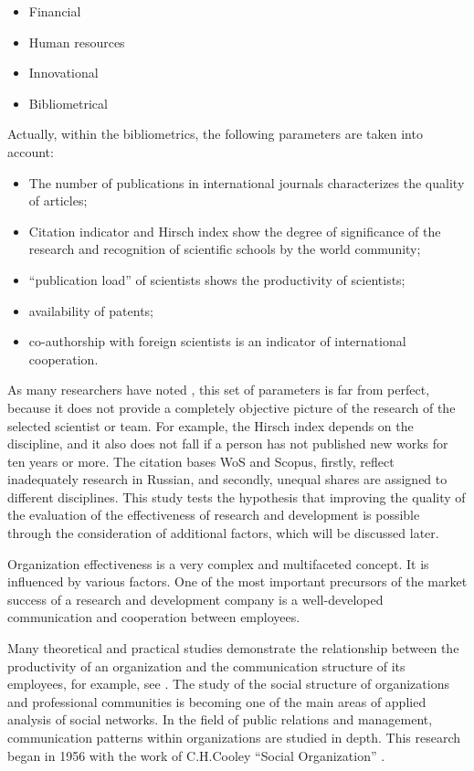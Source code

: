 \documentclass[12pt]{report}
\theoremstyle{definition}
\providecommand{\tightlist}{%
	\setlength{\itemsep}{0pt}\setlength{\parskip}{0pt}}
\begin{document}
\begin{itemize}
	\tightlist
	\item Financial
	\item Human resources
	\item Innovational
	\item Bibliometrical
\end{itemize}

Actually, within the bibliometrics, the following parameters are taken into account:

\begin{itemize}
	\tightlist
	\item The number of publications in international journals characterizes the quality of articles;
	\item Citation indicator and Hirsch index show the degree of significance of the research and recognition of scientific schools by the world community;
	\item ``publication load'' of scientists shows the productivity of scientists;
	\item availability of patents;
	\item co-authorship with foreign scientists is an indicator of international cooperation.
\end{itemize}

As many researchers have noted \cite{vonortas1995new, veugelers1998collaboration, faems2005interorganizational}, this set of parameters is far from perfect, because it does not provide a completely objective picture of the research of the selected scientist or team.
For example, the Hirsch index depends on the discipline, and it also does not fall if a person has not published new works for ten years or more. 
The citation bases WoS and Scopus, firstly, reflect inadequately research in Russian, and secondly, unequal shares are assigned to different disciplines.
This study tests the hypothesis that improving the quality of the evaluation of the effectiveness of research and development is possible through the consideration of additional factors, which will be discussed later.

Organization effectiveness is a very complex and multifaceted concept.
It is influenced by various factors.
One of the most important precursors of the market success of a research and development company is a well-developed communication and cooperation between employees.

Many theoretical and practical studies demonstrate the relationship between the productivity of an organization and the communication structure of its employees, for example, see \cite{allen1984managing,noe2006human}.
The study of the social structure of organizations and professional communities is becoming one of the main areas of applied analysis of social networks.
In the field of public relations and management, communication patterns within organizations are studied in depth.
This research began in 1956 with the work of C.H.Cooley ``Social Organization'' \cite{cooley1956social}.
\end{document}
